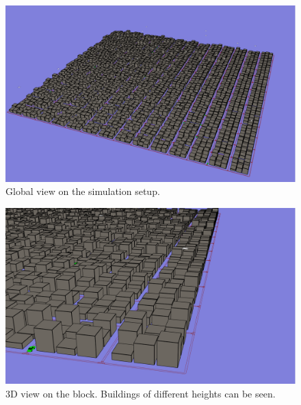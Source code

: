 \documentclass[]{nsm-thesis}
\begin{document}
\begin{figure}
	\centering
	\includegraphics[width=1\textwidth]{figures/GlobalView3D.png}
	\caption{Global view on the simulation setup.}
	\label{fig:manhattangrid3d}
\end{figure}

\begin{figure}
	\centering
	\includegraphics[width=1\textwidth]{figures/GlobalView3D-Block.png}
	\caption{3D view on the block. Buildings of different heights can be seen.}
	\label{fig:manhattangrid3dblock}
\end{figure}
\end{document}
